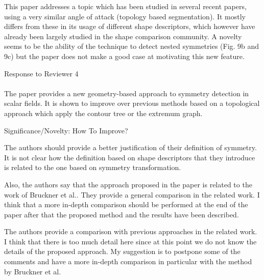 \documentclass[10pt]{article}
\begin{document}
   This paper addresses a topic which has been studied in several recent
   papers, using a very similar angle of attack (topology based
   segmentation). It mostly differs from these in its usage of different
   shape descriptors, which however have already been largely studied in the
   shape comparison community. 
   A novelty seems to be the ability of the technique to detect nested
   symmetries (Fig. 9b and 9c) but the paper does not make a good case at
   motivating this new feature. 

{\noindent \LARGE Response to Reviewer 4}\\\\
   The paper provides a new geometry-based approach to symmetry detection in
   scalar fields. It is shown to improve over previous methods based on a
   topological approach which apply the contour tree or the extremum graph.

Significance/Novelty: How To Improve? 

   The authors should provide a better justification of their definition of
   symmetry. It is not clear how the definition based on shape descriptors
   that they introduce is related to the one based on symmetry
   transformation. 

   Also, the authors say that the approach proposed in the paper is related
   to the work of Bruckner et al.. They provide a general comparison in the
   related work. I think that a more in-depth comparison should be performed
   at the end of the paper after that the proposed method and the results
   have been described.

   The authors provide a comparison with previous approaches in the related
   work. I think that there is too much detail here since at this point we
   do not know the details of the proposed approach. My suggestion is to
   postpone some of the comments and have a more in-depth comparison in
   particular with the method by Bruckner et al.
\end{document}
